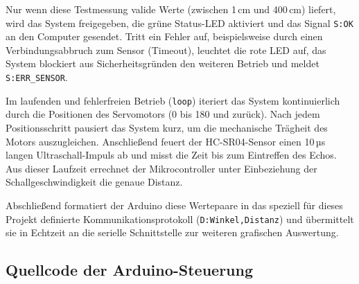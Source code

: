 Nur wenn diese Testmessung valide Werte (zwischen 1\,cm und 400\,cm) liefert, wird das System freigegeben, die grüne Status-LED aktiviert und das Signal \texttt{S:OK} an den Computer gesendet. Tritt ein Fehler auf, beispielsweise durch einen Verbindungsabbruch zum Sensor (Timeout), leuchtet die rote LED auf, das System blockiert aus Sicherheitsgründen den weiteren Betrieb und meldet \texttt{S:ERR\_SENSOR}.

Im laufenden und fehlerfreien Betrieb (\texttt{loop}) iteriert das System kontinuierlich durch die Positionen des Servomotors (0\textdegree{} bis 180\textdegree{} und zurück). Nach jedem Positionsschritt pausiert das System kurz, um die mechanische Trägheit des Motors auszugleichen. Anschließend feuert der HC-SR04-Sensor einen 10\,µs langen Ultraschall-Impuls ab und misst die Zeit bis zum Eintreffen des Echos. Aus dieser Laufzeit errechnet der Mikrocontroller unter Einbeziehung der Schallgeschwindigkeit die genaue Distanz. 

Abschließend formatiert der Arduino diese Wertepaare in das speziell für dieses Projekt definierte Kommunikationsprotokoll (\texttt{D:Winkel,Distanz}) und übermittelt sie in Echtzeit an die serielle Schnittstelle zur weiteren grafischen Auswertung.

\newpage
\subsection{Quellcode der Arduino-Steuerung}


